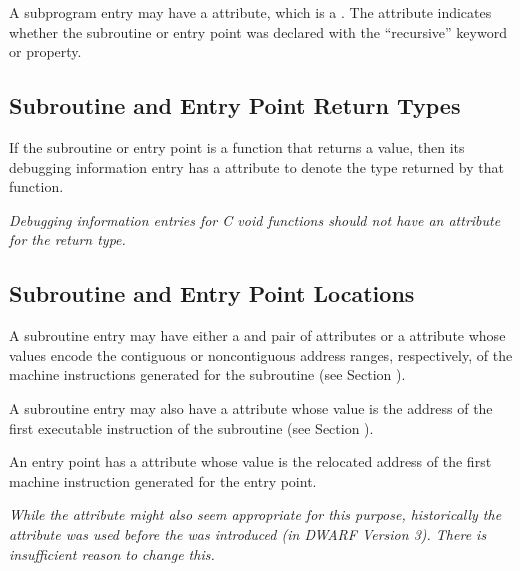 A subprogram entry may have a  attribute, which
is a . 
The attribute indicates whether the subroutine
or entry point was declared with the ``recursive'' keyword
or property.



\subsection{Subroutine and Entry Point Return Types}
\label{chap:subroutineandentrypointreturntypes}

If the subroutine or entry point is a function that returns a
value, then its debugging information entry has a 
attribute to denote the type returned by that function.

\textit{Debugging information entries for C void functions should
not have an attribute for the return type.  }


\subsection{Subroutine and Entry Point Locations}
\label{chap:subroutineandentrypointlocations}

A subroutine entry may have either a  and
 pair of attributes or a  attribute
whose values encode the contiguous or non\dash contiguous address
ranges, respectively, of the machine instructions generated
for the subroutine (see 
Section ).

A subroutine entry may also have a  attribute
whose value is the address of the first executable instruction
of the subroutine (see 
Section ).

An entry point has a  attribute whose value is the
relocated address of the first machine instruction generated
for the entry point.

\textit{While the  attribute might also seem appropriate
for this purpose, historically the  attribute
was used before the  was introduced (in DWARF
Version 3). There is insufficient reason to change this.}


